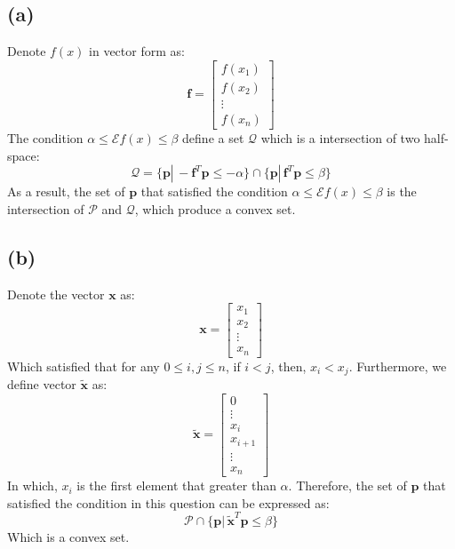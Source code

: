 \documentclass[10pt,a4paper]{article}
\begin{document}
\subsection*{(a)}
Denote $f(x)$ in vector form as:
\begin{equation*}
	\mathbf{f} = \begin{bmatrix}
	f(x_{1}) \\
	f(x_{2}) \\
	\vdots \\
	f(x_{n})
	\end{bmatrix}
\end{equation*}
The condition $\alpha \leq \mathcal{E}f(x) \leq \beta$ define a set $\mathcal{Q}$ which is a intersection of two half-space:
\begin{equation*}
	\mathcal{Q} = \{ \mathbf{p} |\, -\mathbf{f}^{T} \mathbf{p} \leq -\alpha \} \cap \{ \mathbf{p} |\, \mathbf{f}^{T} \mathbf{p} \leq \beta \}
\end{equation*}
As a result, the set of $\mathbf{p}$ that satisfied the condition $\alpha \leq \mathcal{E}f(x) \leq \beta$ is the intersection of $\mathcal{P}$ and $\mathcal{Q}$, which produce a convex set.

\subsection*{(b)}
Denote the vector $\mathbf{x}$ as:
\begin{equation*}
	\mathbf{x} = \begin{bmatrix}
	x_{1} \\
	x_{2} \\
	\vdots \\
	x_{n}
	\end{bmatrix}
\end{equation*}
Which satisfied that for any $0 \leq i, j \leq n$, if $i < j$, then, $x_{i} < x_{j}$. Furthermore, we define vector $\tilde{\mathbf{x}}$ as:
\begin{equation*}
	\tilde{\mathbf{x}} = \begin{bmatrix}
	0 \\
	\vdots \\
	x_{i} \\
	x_{i + 1} \\
	\vdots \\
	x_{n}
	\end{bmatrix}
\end{equation*}
In which, $x_{i}$ is the first element that greater than $\alpha$. Therefore, the set of $\mathbf{p}$ that satisfied the condition in this question can be expressed as:
\begin{equation*}
	\mathcal{P} \cap \{ \mathbf{p} |\, \tilde{\mathbf{x}}^{T} \mathbf{p} \leq \beta \}
\end{equation*}
Which is a convex set.
\end{document}
